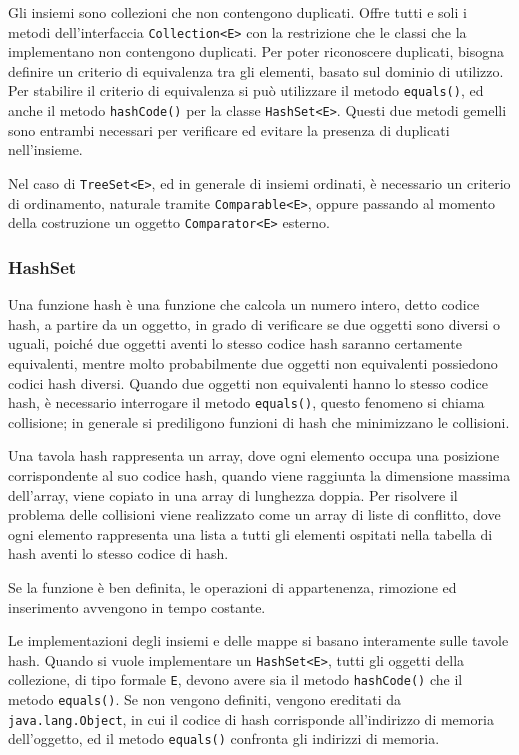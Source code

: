 \documentclass{article}
\numberwithin{equation}{subsection}
\begin{document}
Gli insiemi sono collezioni che non contengono duplicati. Offre tutti e soli i metodi dell'interfaccia \verb|Collection<E>| con la restrizione che le classi che la 
implementano non contengono duplicati. 
Per poter riconoscere duplicati, bisogna definire un criterio di equivalenza tra gli elementi, basato sul dominio di utilizzo. 
Per stabilire il criterio di equivalenza si può utilizzare il metodo \verb|equals()|, ed anche il metodo \verb|hashCode()| per la classe \verb|HashSet<E>|. 
Questi due metodi gemelli sono entrambi necessari per verificare ed evitare la presenza di duplicati nell'insieme. 

Nel caso di \verb|TreeSet<E>|, ed in generale di insiemi ordinati, è necessario un criterio di ordinamento, naturale tramite \verb|Comparable<E>|, oppure passando al 
momento della costruzione un oggetto \verb|Comparator<E>| esterno. 

\subsubsection{HashSet}

Una funzione hash è una funzione che calcola un numero intero, detto codice hash, a partire da un oggetto, in grado di verificare se due oggetti sono diversi o uguali, 
poiché due oggetti aventi lo stesso codice hash saranno certamente equivalenti, mentre molto probabilmente due oggetti non equivalenti possiedono codici hash diversi. 
Quando due oggetti non equivalenti hanno lo stesso codice hash, è necessario interrogare il metodo \verb|equals()|, questo fenomeno si chiama collisione; in generale 
si prediligono funzioni di hash che minimizzano le collisioni. 

Una tavola hash rappresenta un array, dove ogni elemento occupa una posizione corrispondente al suo codice hash, quando viene raggiunta la dimensione massima dell'array, 
viene copiato in una array di lunghezza doppia. 
Per risolvere il problema delle collisioni viene realizzato come un array di liste di conflitto, dove ogni elemento rappresenta una lista a tutti gli elementi ospitati 
nella tabella di hash aventi lo stesso codice di hash. 

Se la funzione è ben definita, le operazioni di appartenenza, rimozione ed inserimento avvengono in tempo costante. 

Le implementazioni degli insiemi e delle mappe si basano interamente sulle tavole hash. 
Quando si vuole implementare un \verb|HashSet<E>|, tutti gli oggetti della collezione, di tipo formale \verb|E|, devono avere sia il metodo \verb|hashCode()| che il metodo 
\verb|equals()|. 
Se non vengono definiti, vengono ereditati da \verb|java.lang.Object|, in cui il codice di hash corrisponde all'indirizzo di memoria dell'oggetto, ed il metodo \verb|equals()| 
confronta gli indirizzi di memoria. 
\end{document}
